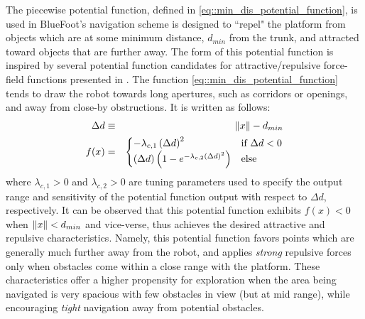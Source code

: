 			The piecewise potential function, defined in \ref{eq::min_dis_potential_function}, is used in BlueFoot's navigation scheme is designed to ``repel" the platform from objects which are at some minimum distance, $d_{min}$ from the trunk, and attracted toward objects that are further away. The form of this potential function is inspired by several potential function candidates for attractive/repulsive force-field functions presented in \cite{ArambulaCosio2004}. The function \ref{eq::min_dis_potential_function} tends to draw the robot towards long apertures, such as corridors or openings, and away from close-by obstructions. It is written as follows:
				\begin{eqnarray}
					\Delta d &\equiv& \left\lVert x\right\rVert-d_{min} \nonumber \\
					f(x) &=& 
					\begin{cases}	
					 	 -\lambda_{c,1} \left(\Delta d\right)^{2} &  \text{if } \Delta d < 0 \\
						\left(\Delta d\right) \left( 1  - e^{ -  \lambda_{c,2} { \left(\Delta d\right) }^{2} } \right) 	&  \text{else}
					\end{cases}
				\label{eq::min_dis_potential_function}
				\end{eqnarray}
			where $\lambda_{c,1}>0$ and $\lambda_{c,2}>0$ are tuning parameters used to specify the output range and sensitivity of the potential function output with respect to $\Delta d$, respectively. It can be observed that this potential function exhibits $f(x)<0$ when $\left\lVert x\right\rVert < d_{min}$ and vice-verse, thus achieves the desired attractive and repulsive characteristics. Namely, this potential function favors points which are generally much further away from the robot, and applies \emph{strong} repulsive forces only when obstacles come within a close range with the platform. These characteristics offer a higher propensity for exploration when the area being navigated is very spacious with few obstacles in view (but at mid range), while encouraging \emph{tight} navigation away from potential obstacles. 


